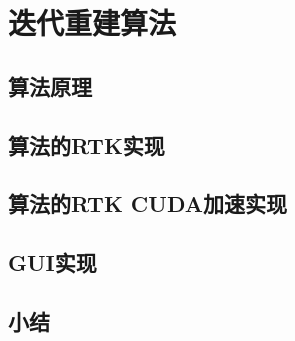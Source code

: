 \chapter{迭代重建算法}


\section{算法原理}
\section{算法的RTK实现}
\section{算法的RTK CUDA加速实现}
\section{GUI实现}

\section{小结}


